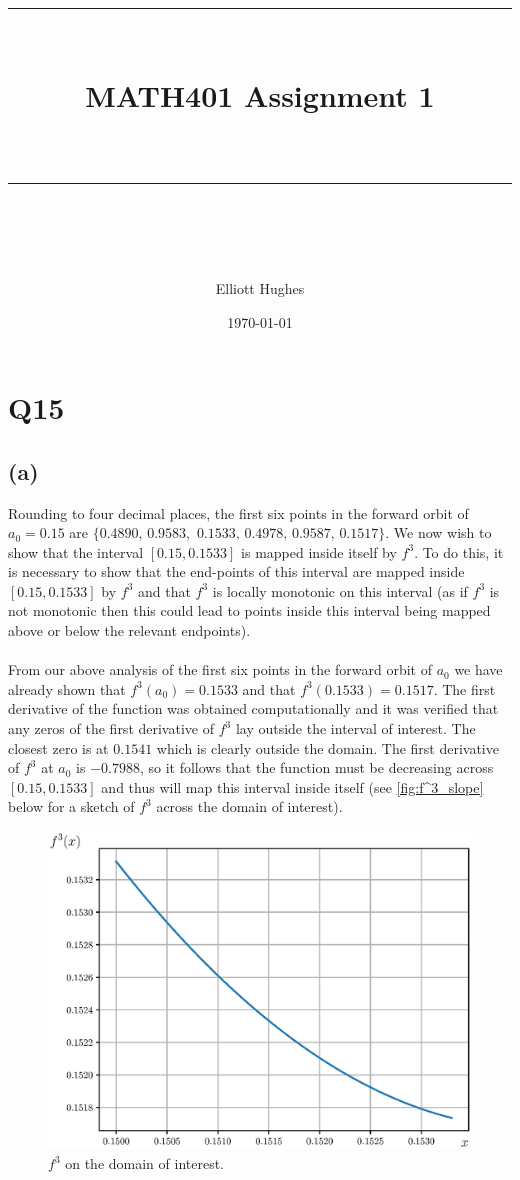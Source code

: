 \documentclass{article}
\title{	
	\normalfont\normalsize 
	\rule{\linewidth}{0.5pt}\\ %
	\vspace{14pt} %
	{\LARGE MATH401 Assignment 1 \\ %
    \large \textit{} \\}
	\vspace{6pt} %
	\rule{\linewidth}{1pt}\\ %
}
\author{Elliott Hughes}
\date{\normalsize\today}
\begin{document}
\maketitle

\section*{Q15}
\subsection*{(a)}
Rounding to four decimal places, the first six points in the forward orbit of $a_0 = 0.15$ are 
$\{0.4890,\,0.9583,$ $0.1533,\,0.4978,\,0.9587,\,0.1517\}$. We now wish to show that the interval 
$[0.15,0.1533]$ is mapped inside itself by $f^3$. To do this, it is necessary to show that the 
end-points of this interval are mapped inside $[0.15,0.1533]$ by $f^3$ and that $f^3$ is locally 
monotonic on this interval (as if $f^3$ is not monotonic then this could lead to points inside this 
interval being mapped above or below the relevant endpoints).

\paragraph{}
From our above analysis of the first six points in the forward orbit of $a_0$ we have already shown 
that $f^3(a_0) = 0.1533$ and that $f^3(0.1533) = 0.1517$. The first derivative of the function 
was obtained computationally and it was verified that any zeros of the first derivative of $f^3$ 
lay outside the interval of interest. The closest zero is at $0.1541$ which is clearly outside 
the domain. The first derivative of $f^3$ at $a_0$ is $-0.7988$, so it follows that the 
function must be decreasing across $[0.15,0.1533]$ and thus will map this interval inside itself 
(see \autoref{fig:f^3_slope} below for a sketch of $f^3$ across the domain of interest).

\begin{figure}[H]
    \centering
    \includegraphics[scale = 0.6]{Figure_1.eps}
	\caption{$f^3$ on the domain of interest.}
    \label{fig:f^3_slope}
\end{figure}
\end{document}

